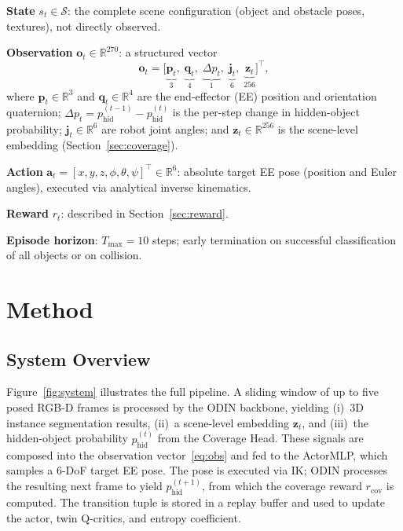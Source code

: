 \documentclass{article}
\newcommand{\phid}{p_{\text{hid}}}
\begin{document}
\textbf{State} $s_t \in \mathcal{S}$: the complete scene configuration (object and obstacle poses, textures), not directly observed.

\textbf{Observation} $\mathbf{o}_t \in \mathbb{R}^{270}$: a structured vector
\begin{equation}
  \mathbf{o}_t =
    \bigl[\underbrace{\mathbf{p}_t}_{3},\;
          \underbrace{\mathbf{q}_t}_{4},\;
          \underbrace{\Delta p_t}_{1},\;
          \underbrace{\mathbf{j}_t}_{6},\;
          \underbrace{\mathbf{z}_t}_{256}
    \bigr]^\top,
  \label{eq:obs}
\end{equation}
where $\mathbf{p}_t \in \mathbb{R}^3$ and $\mathbf{q}_t \in \mathbb{R}^4$ are the end-effector (EE) position and orientation quaternion; $\Delta p_t = \phid^{(t-1)} - \phid^{(t)}$ is the per-step change in hidden-object probability; $\mathbf{j}_t \in \mathbb{R}^6$ are robot joint angles; and $\mathbf{z}_t \in \mathbb{R}^{256}$ is the scene-level embedding (Section~\ref{sec:coverage}).

\textbf{Action} $\mathbf{a}_t = [x,y,z,\phi,\theta,\psi]^\top \in \mathbb{R}^6$: absolute target EE pose (position and Euler angles), executed via analytical inverse kinematics.

\textbf{Reward} $r_t$: described in Section~\ref{sec:reward}.

\textbf{Episode horizon}: $T_{\max} = 10$ steps; early termination on successful classification of all objects or on collision.

\FloatBarrier
\section{Method}
\label{sec:method}

\subsection{System Overview}
\label{sec:overview}

Figure~\ref{fig:system} illustrates the full pipeline. A sliding window of up to five posed RGB-D frames is processed by the ODIN backbone, yielding (i)~3D instance segmentation results, (ii)~a scene-level embedding $\mathbf{z}_t$, and (iii)~the hidden-object probability $\phid^{(t)}$ from the Coverage Head. These signals are composed into the observation vector~\eqref{eq:obs} and fed to the ActorMLP, which samples a 6-DoF target EE pose. The pose is executed via IK; ODIN processes the resulting next frame to yield $\phid^{(t+1)}$, from which the coverage reward $r_\text{cov}$ is computed. The transition tuple is stored in a replay buffer and used to update the actor, twin Q-critics, and entropy coefficient.
\end{document}
